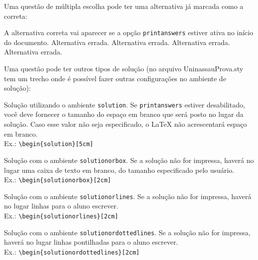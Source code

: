 \documentclass[a4paper, 11pt, addpoints]{exam}
\begin{document}
\begin{questions}
\begin{multicols}{5}
\begin{enumerate}[(A)]
				\end{enumerate}
			\end{multicols}
		\question
		Uma questão de múltipla escolha pode ter uma alternativa já marcada como a correta:
			\begin{choices}
				\justifying
				\CorrectChoice A alternativa correta vai aparecer se a opção \texttt{printanswers} estiver ativa no início do documento.
				\choice Alternativa errada.
				\choice Alternativa errada.
				\choice Alternativa errada.
				\choice Alternativa errada.
			\end{choices}
		\question
		\justifying
		Uma questão pode ter outros tipos de solução (no arquivo UninassauProva.sty tem um trecho onde é possível fazer outras configurações no ambiente de solução):
			\begin{solution}
				\justifying Solução utilizando o ambiente \texttt{solution}. Se \texttt{printanswers} estiver desabilitado, você deve fornecer o tamanho do espaço em branco que será posto no lugar da solução. Caso esse valor não seja especificado, o LaTeX não acrescentará espaço em branco.\\ 
                Ex.: \verb*|\begin{solution}[5cm]|
			\end{solution}
			\begin{solutionorbox}
				Solução com o ambiente \texttt{solutionorbox}. Se a solução não for impressa, haverá no lugar uma caixa de texto em branco, do tamanho especificado pelo usuário.\\ 
                Ex.: \verb*|\begin{solutionorbox}[2cm]|
			\end{solutionorbox}
			\begin{solutionorlines}
				Solução com o ambiente \texttt{solutionorlines}. Se a solução não for impressa, haverá no lugar linhas para o aluno escrever.\\
                Ex.: \verb*|\begin{solutionorlines}[2cm]|
			\end{solutionorlines}
			\begin{solutionordottedlines}
				Solução com o ambiente \texttt{solutionordottedlines}. Se a solução não for impressa, haverá no lugar linhas pontilhadas para o aluno escrever.\\
                Ex.: \verb*|\begin{solutionordottedlines}[2cm]|

\end{solutionordottedlines}
\end{questions}
\end{document}
